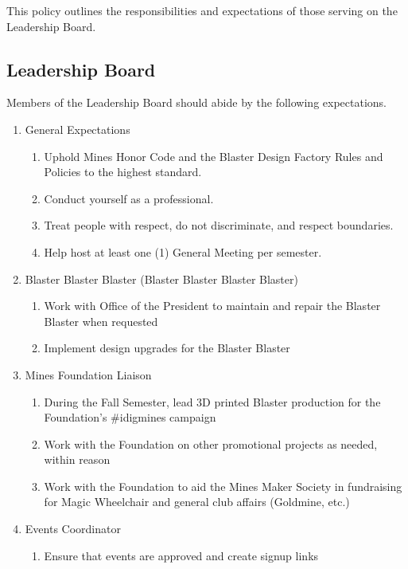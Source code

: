 \documentclass[12pt,letterpaper]{article}
\begin{document}
This policy outlines the responsibilities and expectations of those serving on the Leadership Board. 

\subsection{Leadership Board}

Members of the Leadership Board should abide by the following expectations.

\begin{enumerate}
    \item General Expectations 
    \begin{enumerate}
        \item Uphold Mines Honor Code and the Blaster Design Factory Rules and Policies to the highest standard. 
        \item Conduct yourself as a professional.
        \item Treat people with respect, do not discriminate, and respect boundaries.
        \item Help host at least one (1) General Meeting per semester.
    \end{enumerate}
    \item Blaster Blaster Blaster (Blaster Blaster Blaster Blaster) 
    \begin{enumerate}
        \item Work with Office of the President to maintain and repair the Blaster Blaster when requested
        \item Implement design upgrades for the Blaster Blaster 
    \end{enumerate}
    \item Mines Foundation Liaison 
    \begin{enumerate}
        \item During the Fall Semester, lead 3D printed Blaster production for the Foundation’s \#idigmines campaign
        \item Work with the Foundation on other promotional projects as needed, within reason
        \item Work with the Foundation to aid the Mines Maker Society in fundraising for Magic Wheelchair and general club affairs (Goldmine, etc.)
    \end{enumerate}
    \item Events Coordinator  
    \begin{enumerate}
        \item Ensure that events are approved and create signup links

\end{enumerate}
\end{enumerate}
\end{document}
